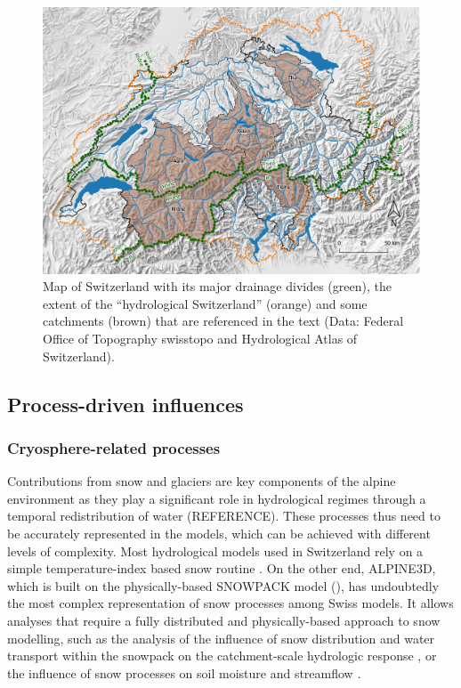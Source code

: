 \documentclass[10pt,a4paper]{article}
\begin{document}
\begin{figure}[htb]
	\begin{center}
		\includegraphics[width=0.95\columnwidth]{figures/map}
		\caption{{Map of Switzerland with its major drainage divides (green), the extent of the ``hydrological Switzerland'' (orange) and some catchments (brown) that are referenced in the text (Data: Federal Office of Topography swisstopo and Hydrological Atlas of Switzerland). \label{fig:map}
		}}
	\end{center}
\end{figure}


\subsection{Process-driven influences}
\label{sec:context:processes}


\subsubsection{Cryosphere-related processes}
\label{sec:context:cryosphere}

Contributions from snow and glaciers are key components of the alpine environment as they play a significant role in hydrological regimes through a temporal redistribution of water (REFERENCE). These processes thus need to be accurately represented in the models, which can be achieved with different levels of complexity. Most hydrological models used in Switzerland rely on a simple temperature-index based snow routine \citep[see for example][]{Jenicek2018}. On the other end, ALPINE3D, which is built on the physically-based SNOWPACK model (\citealt{Bartelt2002, Lehning2002a, Lehning2002b}), has undoubtedly the most complex representation of snow processes among Swiss models. It allows analyses that require a fully distributed and physically-based approach to snow modelling, such as the analysis of the influence of snow distribution and water transport within the snowpack on the catchment-scale hydrologic response \citep{Brauchli2017}, or the influence of snow processes on soil moisture and streamflow \citep{Wever2017}.
\end{document}
